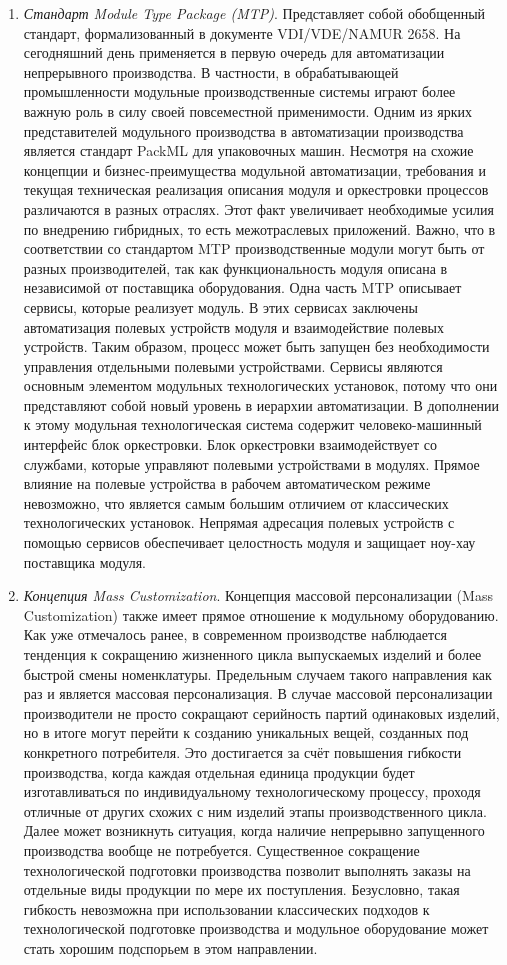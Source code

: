 \begin{enumerate}
	\item\textit{Стандарт Module Type Package (MTP)}. Представляет собой обобщенный стандарт, формализованный в документе VDI/VDE/NAMUR 2658. На сегодняшний день применяется в первую очередь для автоматизации непрерывного производства. В частности, в обрабатывающей промышленности модульные производственные системы играют более важную роль в силу своей повсеместной применимости. Одним из ярких представителей модульного производства в автоматизации производства является стандарт PackML для упаковочных машин. Несмотря на схожие концепции и бизнес-преимущества модульной автоматизации, требования и текущая техническая реализация описания модуля и оркестровки процессов различаются в разных отраслях. Этот факт увеличивает необходимые усилия по внедрению гибридных, то есть межотраслевых приложений. Важно, что в соответствии со стандартом MTP производственные модули могут быть от разных производителей, так как функциональность модуля описана в независимой от поставщика оборудования. Одна часть MTP описывает сервисы, которые реализует модуль. В этих сервисах заключены автоматизация полевых устройств модуля и взаимодействие полевых устройств. Таким образом, процесс может быть запущен без необходимости управления отдельными полевыми устройствами. Сервисы являются основным элементом модульных технологических установок, потому что они представляют собой новый уровень в иерархии автоматизации. В дополнении к этому модульная технологическая система содержит человеко-машинный интерфейс блок оркестровки. Блок оркестровки взаимодействует со службами, которые управляют полевыми устройствами в модулях. Прямое влияние на полевые устройства в рабочем автоматическом режиме невозможно, что является самым большим отличием от классических технологических установок. Непрямая адресация полевых устройств с помощью сервисов обеспечивает целостность модуля и защищает ноу-хау поставщика модуля.
	\item\textit{Концепция Mass Customization}. Концепция массовой персонализации (Mass Customization) также имеет прямое отношение к модульному оборудованию. Как уже отмечалось ранее, в современном производстве наблюдается тенденция к сокращению жизненного цикла выпускаемых изделий и более быстрой смены номенклатуры. Предельным случаем такого направления как раз и является массовая персонализация. В случае массовой персонализации производители не просто сокращают серийность партий одинаковых изделий, но в итоге могут перейти к созданию уникальных вещей, созданных под конкретного потребителя. Это достигается за счёт повышения гибкости производства, когда каждая отдельная единица продукции будет изготавливаться по индивидуальному технологическому процессу, проходя отличные от других схожих с ним изделий этапы производственного цикла. Далее может возникнуть ситуация, когда наличие непрерывно запущенного производства вообще не потребуется. Существенное сокращение технологической подготовки производства позволит выполнять заказы на отдельные виды продукции по мере их поступления. Безусловно, такая гибкость невозможна при использовании классических подходов к технологической подготовке производства и модульное оборудование может стать хорошим подспорьем в этом направлении.
\end{enumerate} 

